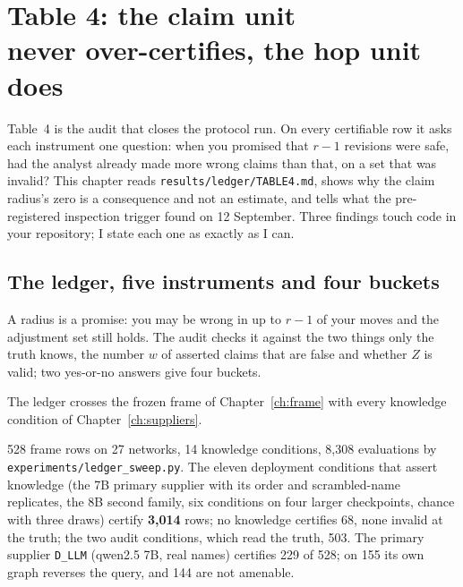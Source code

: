\chapter[Table 4: the claim unit never over-certifies, the hop unit does]{Table 4: the claim unit\\ never over-certifies, the hop unit does}\label{ch:table4}

Table~4 is the audit that closes the protocol run. On every certifiable row it asks each instrument
one question: when you promised that $r-1$ revisions were safe, had the analyst already made more
wrong claims than that, on a set that was invalid? This chapter reads
\texttt{results/ledger/TABLE4.md}, shows why the claim radius's zero is a consequence and not an
estimate, and tells what the pre-registered inspection trigger found on 12 September. Three findings
touch code in your repository; I state each one as exactly as I can.

\begin{antes}
\end{antes}

\section{The ledger, five instruments and four buckets}

\begin{ideia}
A radius is a promise: you may be wrong in up to $r-1$ of your moves and the adjustment set still
holds. The audit checks it against the two things only the truth knows, the number $w$ of asserted
claims that are false and whether $Z$ is valid; two yes-or-no answers give four buckets.
\end{ideia}

The ledger crosses the frozen frame of Chapter~\ref{ch:frame} with every knowledge condition of
Chapter~\ref{ch:suppliers}.

\begin{medido}
528 frame rows on 27 networks, 14 knowledge conditions, 8,308 evaluations by
\texttt{experiments/ledger\_sweep.py}. The eleven deployment conditions that assert knowledge (the 7B
primary supplier with its order and scrambled-name replicates, the 8B second family, six conditions on
four larger checkpoints, chance with three draws) certify \textbf{3,014} rows; no knowledge certifies
68, none invalid at the truth; the two audit conditions, which read the truth, 503. The primary
supplier \texttt{D\_LLM} (qwen2.5 7B, real names) certifies 229 of 528; on 155 its own graph reverses
the query, and 144 are not amenable.
\end{medido}

